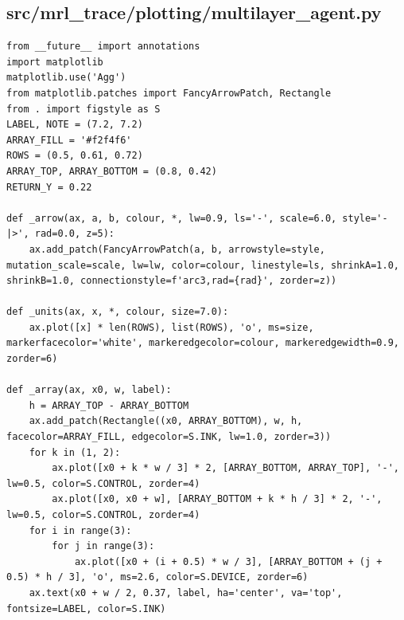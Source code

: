 \documentclass[a4paper,10pt]{article}
\begin{document}
\subsection{src/mrl\_trace/plotting/multilayer\_agent.py}
\begin{Verbatim}
from __future__ import annotations
import matplotlib
matplotlib.use('Agg')
from matplotlib.patches import FancyArrowPatch, Rectangle
from . import figstyle as S
LABEL, NOTE = (7.2, 7.2)
ARRAY_FILL = '#f2f4f6'
ROWS = (0.5, 0.61, 0.72)
ARRAY_TOP, ARRAY_BOTTOM = (0.8, 0.42)
RETURN_Y = 0.22

def _arrow(ax, a, b, colour, *, lw=0.9, ls='-', scale=6.0, style='-|>', rad=0.0, z=5):
    ax.add_patch(FancyArrowPatch(a, b, arrowstyle=style, mutation_scale=scale, lw=lw, color=colour, linestyle=ls, shrinkA=1.0, shrinkB=1.0, connectionstyle=f'arc3,rad={rad}', zorder=z))

def _units(ax, x, *, colour, size=7.0):
    ax.plot([x] * len(ROWS), list(ROWS), 'o', ms=size, markerfacecolor='white', markeredgecolor=colour, markeredgewidth=0.9, zorder=6)

def _array(ax, x0, w, label):
    h = ARRAY_TOP - ARRAY_BOTTOM
    ax.add_patch(Rectangle((x0, ARRAY_BOTTOM), w, h, facecolor=ARRAY_FILL, edgecolor=S.INK, lw=1.0, zorder=3))
    for k in (1, 2):
        ax.plot([x0 + k * w / 3] * 2, [ARRAY_BOTTOM, ARRAY_TOP], '-', lw=0.5, color=S.CONTROL, zorder=4)
        ax.plot([x0, x0 + w], [ARRAY_BOTTOM + k * h / 3] * 2, '-', lw=0.5, color=S.CONTROL, zorder=4)
    for i in range(3):
        for j in range(3):
            ax.plot([x0 + (i + 0.5) * w / 3], [ARRAY_BOTTOM + (j + 0.5) * h / 3], 'o', ms=2.6, color=S.DEVICE, zorder=6)
    ax.text(x0 + w / 2, 0.37, label, ha='center', va='top', fontsize=LABEL, color=S.INK)


\end{Verbatim}
\end{document}
